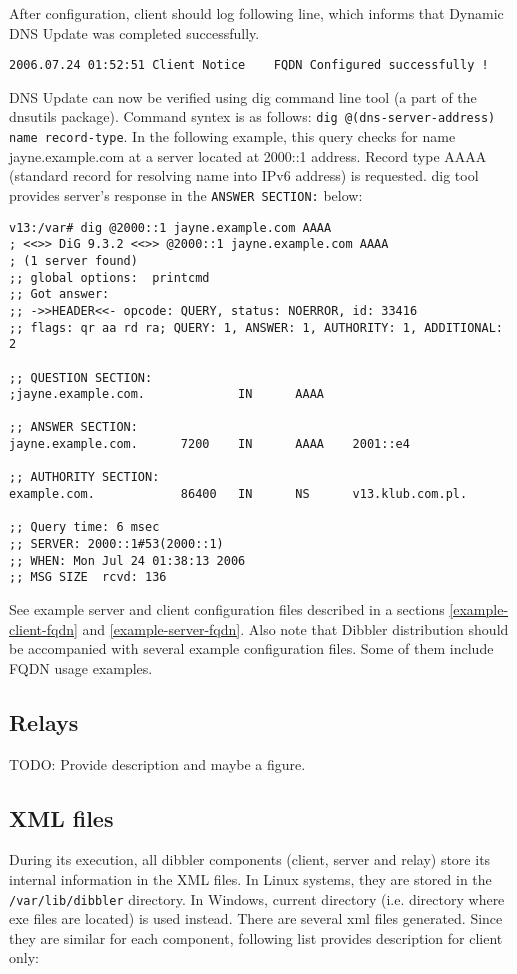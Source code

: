After configuration, client should log following line, which informs
that Dynamic DNS Update was completed successfully.

\begin{verbatim}
2006.07.24 01:52:51 Client Notice    FQDN Configured successfully !
\end{verbatim}

DNS Update can now be verified using dig command line tool (a part of
the dnsutils package). Command syntex is as follows: \verb+dig @(dns-server-address) name record-type+. In the following example,
this query checks for name jayne.example.com at a server located at
2000::1 address. Record type AAAA (standard record for resolving name
into IPv6 address) is requested. dig tool provides server's response
in the \verb+ANSWER SECTION:+ below:

\begin{Verbatim}
v13:/var# dig @2000::1 jayne.example.com AAAA
; <<>> DiG 9.3.2 <<>> @2000::1 jayne.example.com AAAA
; (1 server found)
;; global options:  printcmd
;; Got answer:
;; ->>HEADER<<- opcode: QUERY, status: NOERROR, id: 33416
;; flags: qr aa rd ra; QUERY: 1, ANSWER: 1, AUTHORITY: 1, ADDITIONAL: 2

;; QUESTION SECTION:
;jayne.example.com.             IN      AAAA

;; ANSWER SECTION:
jayne.example.com.      7200    IN      AAAA    2001::e4

;; AUTHORITY SECTION:
example.com.            86400   IN      NS      v13.klub.com.pl.

;; Query time: 6 msec
;; SERVER: 2000::1#53(2000::1)
;; WHEN: Mon Jul 24 01:38:13 2006
;; MSG SIZE  rcvd: 136
\end{Verbatim}

See example server and client configuration files described in a
sections \ref{example-client-fqdn} and \ref{example-server-fqdn}. Also
note that Dibbler distribution should be accompanied with several
example configuration files. Some of them include FQDN usage examples.

\subsection{Relays}
\label{features-relays}
TODO: Provide description and maybe a figure.

\subsection{XML files}
During its execution, all dibbler components (client, server and
relay) store its internal information in the XML files. In Linux
systems, they are stored in the \verb+/var/lib/dibbler+ directory. In
Windows, current directory (i.e. directory where exe files are
located) is used instead. There are several xml files generated. Since
they are similar for each component, following list provides
description for client only:

